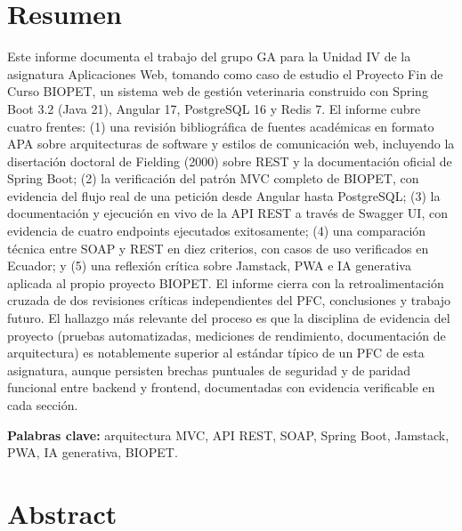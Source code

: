 \documentclass[11pt,a4paper]{article}
\begin{document}
\section*{Resumen}

Este informe documenta el trabajo del grupo GA para la Unidad IV de la
asignatura Aplicaciones Web, tomando como caso de estudio el Proyecto Fin
de Curso BIOPET, un sistema web de gestión veterinaria construido con
Spring Boot 3.2 (Java 21), Angular 17, PostgreSQL 16 y Redis 7. El informe
cubre cuatro frentes: (1) una revisión bibliográfica de fuentes académicas
en formato APA sobre arquitecturas de software y estilos de comunicación
web, incluyendo la disertación doctoral de Fielding (2000) sobre REST y la
documentación oficial de Spring Boot; (2) la verificación del patrón MVC
completo de BIOPET, con evidencia del flujo real de una petición desde
Angular hasta PostgreSQL; (3) la documentación y ejecución en vivo de la
API REST a través de Swagger UI, con evidencia de cuatro endpoints
ejecutados exitosamente; (4) una comparación técnica entre SOAP y REST en
diez criterios, con casos de uso verificados en Ecuador; y (5) una
reflexión crítica sobre Jamstack, PWA e IA generativa aplicada al propio
proyecto BIOPET. El informe cierra con la retroalimentación cruzada de dos
revisiones críticas independientes del PFC, conclusiones y trabajo futuro.
El hallazgo más relevante del proceso es que la disciplina de evidencia del
proyecto (pruebas automatizadas, mediciones de rendimiento, documentación
de arquitectura) es notablemente superior al estándar típico de un PFC de
esta asignatura, aunque persisten brechas puntuales de seguridad y de
paridad funcional entre backend y frontend, documentadas con evidencia
verificable en cada sección.

\textbf{Palabras clave:} arquitectura MVC, API REST, SOAP, Spring Boot,
Jamstack, PWA, IA generativa, BIOPET.


\newpage

\section*{Abstract}
\end{document}
